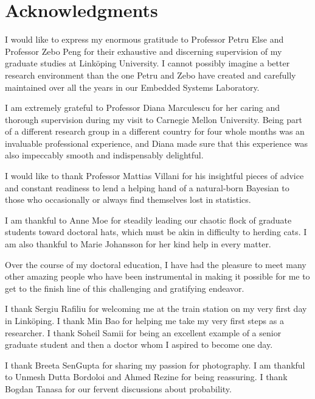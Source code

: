 \chapter*{Acknowledgments}
\newcommand\person[2]{#2 #1}

I would like to express my enormous gratitude to Professor \person{Else}{Petru}
and Professor \person{Peng}{Zebo} for their exhaustive and discerning
supervision of my graduate studies at Linköping University. I cannot possibly
imagine a better research environment than the one Petru and Zebo have created
and carefully maintained over all the years in our Embedded Systems Laboratory.

I am extremely grateful to Professor \person{Marculescu}{Diana} for her caring
and thorough supervision during my visit to Carnegie Mellon University. Being
part of a different research group in a different country for four whole months
was an invaluable professional experience, and Diana made sure that this
experience was also impeccably smooth and indispensably delightful.

I would like to thank Professor \person{Villani}{Mattias} for his insightful
pieces of advice and constant readiness to lend a helping hand of a natural-born
Bayesian to those who occasionally or always find themselves lost in statistics.

I am thankful to \person{Moe}{Anne} for steadily leading our chaotic flock of
graduate students toward doctoral hats, which must be akin in difficulty to
herding cats. I am also thankful to \person{Johansson}{Marie} for her kind help
in every matter.

Over the course of my doctoral education, I have had the pleasure to meet many
other amazing people who have been instrumental in making it possible for me to
get to the finish line of this challenging and gratifying endeavor.

I thank \person{Rafiliu}{Sergiu} for welcoming me at the train station on my
very first day in Linköping. I thank \person{Bao}{Min} for helping me take my
very first steps as a researcher. I thank \person{Samii}{Soheil} for being an
excellent example of a senior graduate student and then a doctor whom I aspired
to become one day.

I thank \person{SenGupta}{Breeta} for sharing my passion for photography. I am
thankful to \person{Dutta Bordoloi}{Unmesh} and \person{Rezine}{Ahmed} for being
reassuring. I thank \person{Tanasa}{Bogdan} for our fervent discussions about
probability.


